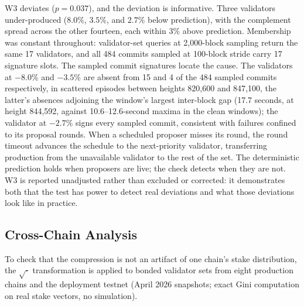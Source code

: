\documentclass[11pt,a4paper]{article}
\begin{document}
W3 deviates ($p = 0.037$), and the deviation is informative. Three validators under-produced ($8.0\%$, $3.5\%$, and $2.7\%$ below prediction), with the complement spread across the other fourteen, each within $3\%$ above prediction. Membership was constant throughout: validator-set queries at 2{,}000-block sampling return the same 17 validators, and all 484 commits sampled at 100-block stride carry 17 signature slots. The sampled commit signatures locate the cause. The validators at $-8.0\%$ and $-3.5\%$ are absent from 15 and 4 of the 484 sampled commits respectively, in scattered episodes between heights 820{,}600 and 847{,}100, the latter's absences adjoining the window's largest inter-block gap (17.7 seconds, at height 844{,}592, against 10.6--12.6-second maxima in the clean windows); the validator at $-2.7\%$ signs every sampled commit, consistent with failures confined to its proposal rounds. When a scheduled proposer misses its round, the round timeout advances the schedule to the next-priority validator, transferring production from the unavailable validator to the rest of the set. The deterministic prediction holds when proposers are live; the check detects when they are not. W3 is reported unadjusted rather than excluded or corrected: it demonstrates both that the test has power to detect real deviations and what those deviations look like in practice.

\subsection{Cross-Chain Analysis}

To check that the compression is not an artifact of one chain's stake distribution, the $\sqrt{\cdot}$ transformation is applied to bonded validator sets from eight production chains and the deployment testnet (April 2026 snapshots; exact Gini computation on real stake vectors, no simulation).
\end{document}
